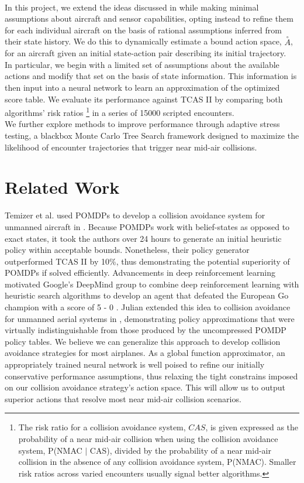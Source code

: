 \documentclass[journal, a4paper]{IEEEtran}
\begin{document}
\\In this project, we extend the ideas discussed in \cite{deeprlcas} while making minimal assumptions about aircraft and sensor capabilities, opting instead to refine them for each individual aircraft on the basis of rational assumptions inferred from their state history. We do this to dynamically estimate a bound action space, $\overset{\circ}{A}$, for an aircraft given an initial state-action pair describing its initial trajectory. 
\\In particular, we begin with a limited set of assumptions about the available actions and modify that set on the basis of state information. This information is then input into a neural network to learn an approximation of the optimized score table. We evaluate its performance against TCAS II by comparing both algorithms' risk ratios \footnote{The risk ratio for a collision avoidance system, $CAS$, is given expressed as the probability of a near mid-air collision when using the collision avoidance system, P(NMAC $\vert$ CAS), divided by the probability of a near mid-air collision in the absence of any collision avoidance system, P(NMAC). Smaller risk ratios across varied encounters usually signal better algorithms.} in a series of 15000 scripted encounters. 
\\We further explore methods to improve performance through adaptive stress testing, a blackbox Monte Carlo Tree Search framework designed to maximize the likelihood of encounter trajectories that trigger near mid-air collisions. 

\section{Related Work}
    Temizer et al. used POMDPs to develop a collision avoidance system for unmanned aircraft in \cite{origpomd}. Because POMDPs work with belief-states as opposed to exact states, it took the authors over 24 hours to generate an initial heuristic policy within acceptable bounds. Nonetheless, their policy generator outperformed TCAS II by 10\%, thus demonstrating the potential superiority of POMDPs if solved efficiently. Advancements in deep reinforcement learning motivated Google's DeepMind group to combine deep reinforcement learning with heuristic search algorithms to develop an agent that defeated the European Go champion with a score of 5 - 0 \cite{googlego}. Julian extended this idea to collision avoidance for unmanned aerial systems in \cite{deeprlcas}, demonstrating policy approximations that were virtually indistinguishable from those produced by the uncompressed POMDP policy tables. We believe we can generalize this approach to develop collision avoidance strategies for most airplanes. As a global function approximator, an appropriately trained neural network is well poised to refine our initially conservative performance assumptions, thus relaxing the tight constrains imposed on our collision avoidance strategy's action space. This will allow us to output superior actions that resolve most near mid-air collision scenarios.
\end{document}
